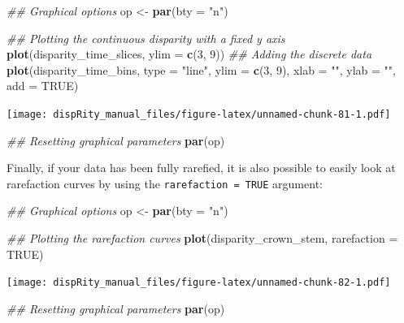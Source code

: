 \documentclass[
]{book}
\newenvironment{Shaded}{\begin{snugshade}}{\end{snugshade}}
\newcommand{\CommentTok}[1]{\textcolor[rgb]{0.56,0.35,0.01}{\textit{#1}}}
\newcommand{\DataTypeTok}[1]{\textcolor[rgb]{0.13,0.29,0.53}{#1}}
\newcommand{\DecValTok}[1]{\textcolor[rgb]{0.00,0.00,0.81}{#1}}
\newcommand{\KeywordTok}[1]{\textcolor[rgb]{0.13,0.29,0.53}{\textbf{#1}}}
\newcommand{\NormalTok}[1]{#1}
\newcommand{\OtherTok}[1]{\textcolor[rgb]{0.56,0.35,0.01}{#1}}
\newcommand{\StringTok}[1]{\textcolor[rgb]{0.31,0.60,0.02}{#1}}
\begin{document}
\begin{Shaded}
\begin{Highlighting}[]
\CommentTok{\#\# Graphical options}
\NormalTok{op \textless{}{-}}\StringTok{ }\KeywordTok{par}\NormalTok{(}\DataTypeTok{bty =} \StringTok{"n"}\NormalTok{)}

\CommentTok{\#\# Plotting the continuous disparity with a fixed y axis}
\KeywordTok{plot}\NormalTok{(disparity\_time\_slices, }\DataTypeTok{ylim =} \KeywordTok{c}\NormalTok{(}\DecValTok{3}\NormalTok{, }\DecValTok{9}\NormalTok{))}
\CommentTok{\#\# Adding the discrete data}
\KeywordTok{plot}\NormalTok{(disparity\_time\_bins, }\DataTypeTok{type =} \StringTok{"line"}\NormalTok{, }\DataTypeTok{ylim =} \KeywordTok{c}\NormalTok{(}\DecValTok{3}\NormalTok{, }\DecValTok{9}\NormalTok{),}
     \DataTypeTok{xlab =} \StringTok{""}\NormalTok{, }\DataTypeTok{ylab =} \StringTok{""}\NormalTok{, }\DataTypeTok{add =} \OtherTok{TRUE}\NormalTok{)}
\end{Highlighting}
\end{Shaded}

\texttt{[image: dispRity\_manual\_files/figure-latex/unnamed-chunk-81-1.pdf]}

\begin{Shaded}
\begin{Highlighting}[]
\CommentTok{\#\# Resetting graphical parameters}
\KeywordTok{par}\NormalTok{(op)}
\end{Highlighting}
\end{Shaded}

Finally, if your data has been fully rarefied, it is also possible to easily look at rarefaction curves by using the \texttt{rarefaction\ =\ TRUE} argument:

\begin{Shaded}
\begin{Highlighting}[]
\CommentTok{\#\# Graphical options}
\NormalTok{op \textless{}{-}}\StringTok{ }\KeywordTok{par}\NormalTok{(}\DataTypeTok{bty =} \StringTok{"n"}\NormalTok{)}

\CommentTok{\#\# Plotting the rarefaction curves}
\KeywordTok{plot}\NormalTok{(disparity\_crown\_stem, }\DataTypeTok{rarefaction =} \OtherTok{TRUE}\NormalTok{)}
\end{Highlighting}
\end{Shaded}

\texttt{[image: dispRity\_manual\_files/figure-latex/unnamed-chunk-82-1.pdf]}

\begin{Shaded}
\begin{Highlighting}[]
\CommentTok{\#\# Resetting graphical parameters}
\KeywordTok{par}\NormalTok{(op)}
\end{Highlighting}
\end{Shaded}
\end{document}
